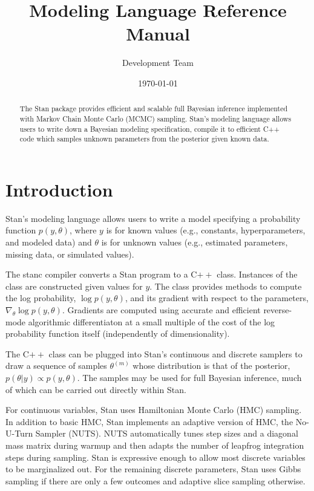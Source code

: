 \documentclass[11pt]{report}
\title{\Stan Modeling Language Reference Manual}
\author{\Stan Development Team}
\date{\footnotesize \today}
\newcommand{\Stan}{Stan\xspace}
\newcommand*{\Cpp}{C{\ensuremath{++}}\xspace}
\begin{document}
\maketitle

\begin{abstract}
  The \Stan package provides efficient and scalable full Bayesian
  inference implemented with Markov Chain Monte Carlo (MCMC) sampling.
  \Stan's modeling language allows users to write down a Bayesian
  modeling specification, compile it to efficient C++ code which
  samples unknown parameters from the posterior given known data.
\end{abstract}

\chapter{Introduction}

\Stan's modeling language allows users to write a model specifying a
probability function $p(y,\theta)$, where $y$ is for known values
(e.g., constants, hyperparameters, and modeled data) and $\theta$ is
for unknown values (e.g., estimated parameters, missing data, or
simulated values).

The stanc compiler converts a Stan program to a \Cpp class.
Instances of the class are constructed given values for $y$.  The
class provides methods to compute the log probability, $\log
p(y,\theta)$, and its gradient with respect to the parameters,
$\nabla_{\theta} \log p(y,\theta)$.  Gradients are computed using
accurate and efficient reverse-mode algorithmic differentiaton at a
small multiple of the cost of the log probability function itself
(independently of dimensionality).

The \Cpp class can be plugged into Stan's continuous and discrete
samplers to draw a sequence of samples $\theta^{(m)}$ whose
distribution is that of the posterior, $p(\theta|y) \propto
p(y,\theta)$.  The samples may be used for full Bayesian
inference, much of which can be carried out directly within Stan.

For continuous variables, Stan uses Hamiltonian Monte Carlo (HMC)
sampling.  In addition to basic HMC, Stan implements an adaptive
version of HMC, the No-U-Turn Sampler (NUTS).  NUTS automatically
tunes step sizes and a diagonal mass matrix during warmup and then
adapts the number of leapfrog integration steps during sampling.
Stan is expressive enough to allow most discrete variables to be
marginalized out.  For the remaining discrete parameters, Stan uses
Gibbs sampling if there are only a few outcomes and adaptive slice
sampling otherwise.
\end{document}
